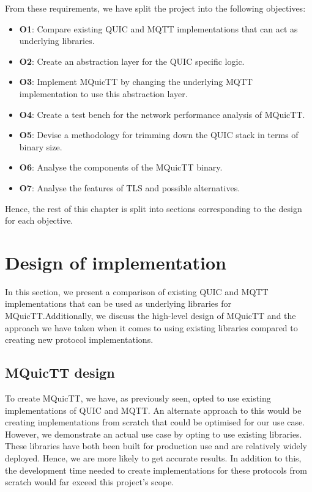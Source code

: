 From these requirements, we have split the project into the following objectives:

\begin{itemize}
    \item \textbf{O1}: Compare existing QUIC and MQTT implementations that can act as underlying libraries.
    \item \textbf{O2}: Create an abstraction layer for the QUIC specific logic.
    \item \textbf{O3}: Implement MQuicTT by changing the underlying MQTT implementation to use this abstraction layer.
    \item \textbf{O4}: Create a test bench for the network performance analysis of MQuicTT.
    \item \textbf{O5}: Devise a methodology for trimming down the QUIC stack in terms of binary size.
    \item \textbf{O6}: Analyse the components of the MQuicTT binary.
    \item \textbf{O7}: Analyse the features of TLS and possible alternatives.
\end{itemize}

Hence, the rest of this chapter is split into sections corresponding to the design for each objective.

\section{Design of implementation}

In this section, we present a comparison of existing QUIC and MQTT implementations that can be used as underlying libraries for MQuicTT.Additionally, we discuss the high-level design of MQuicTT and the approach we have taken when it comes to using existing libraries compared to creating new protocol implementations.





\subsection{MQuicTT design}

To create MQuicTT, we have, as previously seen, opted to use existing implementations of QUIC and MQTT.
An alternate approach to this would be creating implementations from scratch that could be optimised for our use case.
However, we demonstrate an actual use case by opting to use existing libraries.
These libraries have both been built for production use and are relatively widely deployed.
Hence, we are more likely to get accurate results.
In addition to this, the development time needed to create implementations for these protocols from scratch would far exceed this project's scope.

